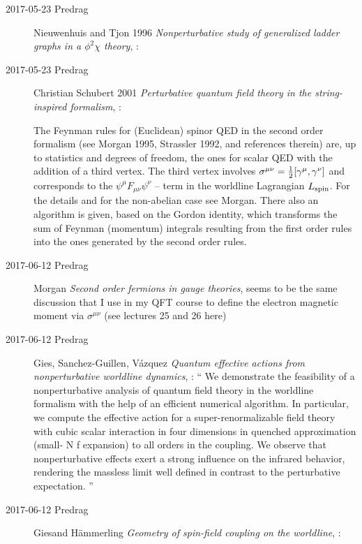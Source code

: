 \begin{description}
\item[2017-05-23 Predrag]
Nieuwenhuis and Tjon 1996
{\em Nonperturbative study of generalized ladder graphs in a {$\phi^2\chi$} theory},
:

\item[2017-05-23 Predrag]
Christian Schubert 2001
{\em Perturbative quantum field theory in the string-inspired formalism},
:

The Feynman rules for (Euclidean) spinor QED in the second order
formalism (see Morgan 1995,
Strassler 1992, and references therein) are, up to
statistics and degrees of freedom, the ones for scalar QED with the
addition of a third vertex. %
The third vertex involves
$\sigma^{\mu\nu}={1\over 2}[\gamma^{\mu},\gamma^{\nu}]$
and corresponds to the $\psi^{\mu}F_{\mu\nu}\psi^{\nu}$
-- term in the worldline Lagrangian $L_{\rm spin}$.
For the details and for the non-abelian case see Morgan.
There also an algorithm is given, based on the Gordon identity, which
transforms the sum of Feynman (momentum) integrals resulting from the
first order rules into the ones generated by the second order rules.

\item[2017-06-12 Predrag]
Morgan
{\em Second order fermions in gauge theories}, 
seems to be the same discussion that I use in my QFT course to define the
electron magnetic moment via $\sigma^{\mu\nu}$ (see lectures 25 and 26
{here})

\item[2017-06-12 Predrag]
Gies, Sanchez-Guillen, V{\'a}zquez
{\em Quantum effective actions from nonperturbative worldline dynamics},
 : ``
We demonstrate the feasibility of a nonperturbative analysis of quantum
field theory in the worldline formalism with the help of an efficient
numerical algorithm. In particular, we compute the effective action for a
super-renormalizable field theory with cubic scalar interaction in four
dimensions in quenched approximation (small- N f expansion) to all orders
in the coupling. We observe that nonperturbative effects exert a strong
influence on the infrared behavior, rendering the massless limit well
defined in contrast to the perturbative expectation.
''

\item[2017-06-12 Predrag]
Giesand H{\"a}mmerling
{\em Geometry of spin-field coupling on the worldline},
:


\end{description}
